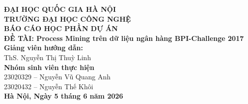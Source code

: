 \documentclass[a4paper,12pt]{article}
\begin{document}
\begin{titlepage}
    \begin{center}
        \textbf{\large ĐẠI HỌC QUỐC GIA HÀ NỘI}\\
        \textbf{\large TRƯỜNG ĐẠI HỌC CÔNG NGHỆ}\\[1.5cm]


        {\Large \textbf{BÁO CÁO HỌC PHẦN DỰ ÁN}}\\[0.5cm]
        {\Large \textbf{ĐỀ TÀI: Process Mining trên dữ liệu ngân hàng BPI-Challenge 2017}}\\[2cm]

        \textbf{\large Giảng viên hướng dẫn:}\\
        ThS. Nguyễn Thị Thuỳ Linh\\
        \textbf{\large Nhóm sinh viên thực hiện}\\
        23020329 – Nguyễn Vũ Quang Anh\\
        23020432 – Nguyễn Thế Khôi\\[2cm]

        \textbf{Hà Nội, Ngày 5 tháng 6 năm 2026}
    \end{center}
\end{titlepage}

\begin{abstract}
Nghiên cứu này áp dụng các kỹ thuật Process Mining toàn diện trên tập dữ liệu BPI Challenge 2017 nhằm chẩn đoán và tối ưu hóa quy trình xét duyệt khoản vay ngân hàng. Khởi đầu với phân tích nghiệp vụ, kết quả chỉ ra chiến lược phát hành nhiều đề xuất (multi-offer) giúp tăng tỷ lệ chốt giao dịch lên 59\% nhưng lại tạo ra nút thắt cổ chai bổ sung hồ sơ, làm chậm tiến độ tổng thể tới 7 ngày. Đánh giá tuân thủ khẳng định quy trình vận hành được thực thi chuẩn chỉ (Trace Fitness đạt 99.30\%), đồng thời việc áp dụng Object-Centric Process Mining (OCPM) giúp cung cấp thêm góc nhìn tương tác đa chiều giữa các đối tượng. Cuối cùng, một hệ thống học máy theo hướng đa tiền tố (multi-prefix Early Warning System) được xây dựng để dự đoán kết quả tín dụng từ sớm, đạt hiệu suất ROC-AUC 0.85 tại tiền tố 12. Tóm lại, dự án không chỉ nhận diện chính xác nguyên nhân cốt lõi gây chậm trễ hiệu suất, mà còn cung cấp giải pháp dự báo chủ động nâng cao năng lực quản trị rủi ro.
\end{abstract}
\end{document}
